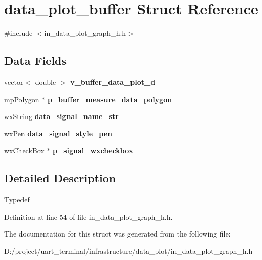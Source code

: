 \section{data\+\_\+plot\+\_\+buffer Struct Reference}
\label{structdata__plot__buffer}


{\ttfamily \#include $<$in\+\_\+data\+\_\+plot\+\_\+graph\+\_\+h.\+h$>$}

\subsection*{Data Fields}
\begin{DoxyCompactItemize}
\item 
\mbox{\label{structdata__plot__buffer_ae49108e5b3e55b3f8601095bee281211}} 
vector$<$ double $>$ {\bfseries v\+\_\+buffer\+\_\+data\+\_\+plot\+\_\+d}
\item 
\mbox{\label{structdata__plot__buffer_a1f17446680e66bcf2eab8352edd52345}} 
mp\+Polygon $\ast$ {\bfseries p\+\_\+buffer\+\_\+measure\+\_\+data\+\_\+polygon}
\item 
\mbox{\label{structdata__plot__buffer_a5113f9ac4b41965cfb443ebb272386bb}} 
wx\+String {\bfseries data\+\_\+signal\+\_\+name\+\_\+str}
\item 
\mbox{\label{structdata__plot__buffer_aaed1e1395c402f34a90f3891ee7f990d}} 
wx\+Pen {\bfseries data\+\_\+signal\+\_\+style\+\_\+pen}
\item 
\mbox{\label{structdata__plot__buffer_a1d5d78a8d4a4caea788ef269c1b69e87}} 
wx\+Check\+Box $\ast$ {\bfseries p\+\_\+signal\+\_\+wxcheckbox}
\end{DoxyCompactItemize}


\subsection{Detailed Description}
Typedef 

Definition at line 54 of file in\+\_\+data\+\_\+plot\+\_\+graph\+\_\+h.\+h.



The documentation for this struct was generated from the following file\+:\begin{DoxyCompactItemize}
\item 
D\+:/project/uart\+\_\+terminal/infrastructure/data\+\_\+plot/in\+\_\+data\+\_\+plot\+\_\+graph\+\_\+h.\+h\end{DoxyCompactItemize}

